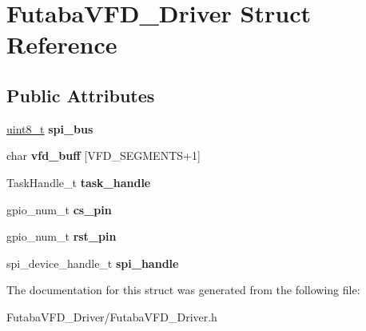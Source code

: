 \hypertarget{structFutabaVFD__Driver}{}\section{Futaba\+V\+F\+D\+\_\+\+Driver Struct Reference}
\label{structFutabaVFD__Driver}
\subsection*{Public Attributes}
\begin{DoxyCompactItemize}
\item 
\mbox{\label{structFutabaVFD__Driver_ac4a9c73d236221102b7d0abc2374ee44}} 
\hyperlink{vl53l0x__types_8h_aba7bc1797add20fe3efdf37ced1182c5}{uint8\+\_\+t} {\bfseries spi\+\_\+bus}
\item 
\mbox{\label{structFutabaVFD__Driver_a6d2d3b3751fd0e6b488f2f6f6711efcc}} 
char {\bfseries vfd\+\_\+buff} \mbox{[}V\+F\+D\+\_\+\+S\+E\+G\+M\+E\+N\+TS+1\mbox{]}
\item 
\mbox{\label{structFutabaVFD__Driver_a5755c5f5223d6983cdc65ecb87b9d2f7}} 
Task\+Handle\+\_\+t {\bfseries task\+\_\+handle}
\item 
\mbox{\label{structFutabaVFD__Driver_a20275e3fb3d311ca79d10b129f22bec0}} 
gpio\+\_\+num\+\_\+t {\bfseries cs\+\_\+pin}
\item 
\mbox{\label{structFutabaVFD__Driver_a4d69205d07e9fa8cc152d3b56152a0a4}} 
gpio\+\_\+num\+\_\+t {\bfseries rst\+\_\+pin}
\item 
\mbox{\label{structFutabaVFD__Driver_a11e9bebdb7437ce607f2d9e0f2fc2de9}} 
spi\+\_\+device\+\_\+handle\+\_\+t {\bfseries spi\+\_\+handle}
\end{DoxyCompactItemize}


The documentation for this struct was generated from the following file\+:\begin{DoxyCompactItemize}
\item 
Futaba\+V\+F\+D\+\_\+\+Driver/Futaba\+V\+F\+D\+\_\+\+Driver.\+h\end{DoxyCompactItemize}
